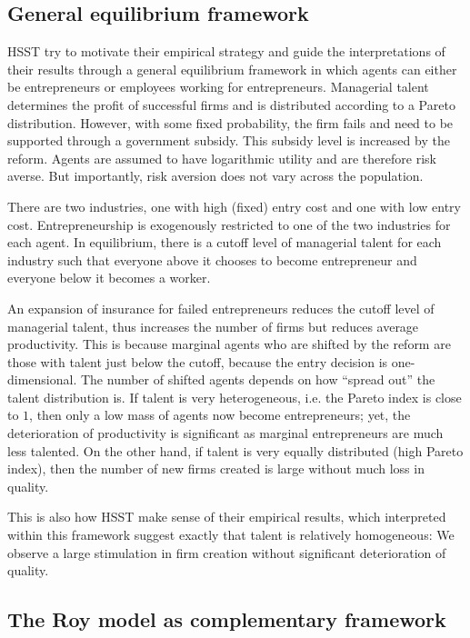 \subsection{General equilibrium framework}

HSST try to motivate their empirical strategy and guide the interpretations of their results through a general equilibrium framework in which agents can either be entrepreneurs or employees working for entrepreneurs. Managerial talent determines the profit of successful firms and is distributed according to a Pareto distribution. However, with some fixed probability, the firm fails and need to be supported through a government subsidy. This subsidy level is increased by the reform. Agents are assumed to have logarithmic utility and are therefore risk averse. But importantly, risk aversion does not vary across the population.

There are two industries, one with high (fixed) entry cost and one with low entry cost. Entrepreneurship is exogenously restricted to one of the two industries for each agent. In equilibrium, there is a cutoff level of managerial talent for each industry such that everyone above it chooses to become entrepreneur and everyone below it becomes a worker.

An expansion of insurance for failed entrepreneurs reduces the cutoff level of managerial talent, thus increases the number of firms but reduces average productivity. This is because marginal agents who are shifted by the reform are those with talent just below the cutoff, because the entry decision is one-dimensional. The number of shifted agents depends on how ``spread out'' the talent distribution is. If talent is very heterogeneous, i.e. the Pareto index is close to $1$, then only a low mass of agents now become entrepreneurs; yet, the deterioration of productivity is significant as marginal entrepreneurs are much less talented. On the other hand, if talent is very equally distributed (high Pareto index), then the number of new firms created is large without much loss in quality. 

This is also how HSST make sense of their empirical results, which interpreted within this framework suggest exactly that talent is relatively homogeneous: We observe a large stimulation in firm creation without significant deterioration of quality.


\subsection{The Roy model as complementary framework}

